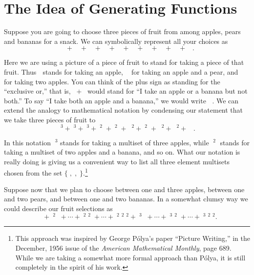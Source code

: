\documentclass[10pt,]{book}
\theoremstyle{plain}
\theoremstyle{definition}
\numberwithin{equation}{chapter}
\newcommand{\apple}{\text{🍎}}
\newcommand{\ap}{\apple}
\newcommand{\banana}{\text{🍌}}
\newcommand{\ba}{\banana}
\newcommand{\pear}{\text{🍐}}
\newcommand{\pe}{\pear}
\begin{document}
\section[{The Idea of Generating Functions}]{The Idea of Generating Functions}\label{sec_genfns-idea}
\typeout{************************************************}
\typeout{************************************************}
Suppose you are going to choose three pieces of fruit from among apples, pears and bananas for a snack.  We can symbolically represent all your choices as%
\begin{equation*}
\ap\ap\ap+\pe\pe\pe+\ba\ba\ba+\ap\ap\pe+\ap\ap\ba+\ap\pe\pe +\pe\pe\ba
+\ap\ba\ba+\pe\ba\ba+\ap\pe\ba.
\end{equation*}
%
\par
Here we are using a picture of a piece of fruit to stand for taking a piece of that fruit. Thus \(\ap\) stands for taking an apple, \(\ap\pe\) for taking an apple and a pear, and \(\ap\ap\) for taking two apples.  You can think of the plus sign as standing for the ``exclusive or,'' that is, \(\ap+\ba\) would stand for ``I take an apple or a banana but not both.'' To say ``I take both an apple and a banana,'' we would write \(\ap\ba\). We can extend the analogy to mathematical notation by condensing our statement that we take three pieces of fruit to%
\begin{equation*}
\ap^3+\pe^3+\ba^3+\ap^2\pe+\ap^2\ba +\ap\pe^2+\pe^2\ba+
\ap\ba^2+\pe\ba^2 +\ap\pe\ba.
\end{equation*}
%
\par
In this notation \(\ap^3\) stands for taking a multiset of three apples, while \(\ap^2\ba\) stands for taking a multiset of two apples and a banana, and so on. What our notation is really doing is giving us a convenient way to list all three element multisets chosen from the set \(\{\ap,\pe,\ba\}\).\footnote{This approach was inspired by George Pólya's paper ``Picture Writing,'' in the December, 1956 issue of the \emph{American Mathematical Monthly}, page 689. While we are taking a somewhat more formal approach than Pólya, it is still completely in the spirit of his work.\label{fn-9}}%
\par
Suppose now that we plan to choose between one and three apples, between one and two pears, and between one and two bananas. In a somewhat clumsy way we could describe our fruit selections as%
\begin{equation}
\ap\pe\ba+\ap^2\pe\ba+\cdots+\ap^2\pe^2\ba+\cdots +
\ap^2\pe^2\ba^2+\ap^3\pe\ba+
\cdots +\ap^3\pe^2\ba+\cdots +
\ap^3\pe^2\ba^2.\label{uptothreefruits}
\end{equation}
\end{document}
